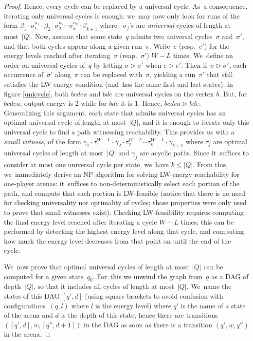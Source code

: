 \begin{proof}
Hence, every cycle can be replaced by a universal cycle. As~a consequence, iterating only universal cycles is enough: we~may now only look for runs of the form $\beta_1\cdot \sigma_1^{n_1}\cdot \beta_2\cdot\sigma_2^{n_2}\cdots
\sigma_k^{n_k}\cdot\beta_{k+1}$ where ~$\sigma_j$'s are \emph{universal} cycles
of length at most~$|Q|$. Now, assume that some state~$q$ admits
two universal cycles~$\sigma$ and~$\sigma'$, and that both cycles
appear along a given run~$\pi$. Write~$e$ (resp.~$e'$) for the energy
levels reached after iterating~$\sigma$ (reap.~$\sigma'$) $W-L$
times. We~define an order on universal cycles of~$q$ by letting
$\sigma \triangleright \sigma'$ when $e>e'$.  Then if~$\sigma \triangleright
\sigma'$, each occurrence of~$\sigma'$ along~$\pi$ can be replaced
with~$\sigma$, yielding a run~$\pi'$ that still satisfies the LW-energy condition (and~has the same first and last states). in figure \ref{unicycle}, both $bcdea$ and $bde$ are universal cycles on the vertex $b$. But, for $bcdea$, output energy is 2 while for $bde$ it is 1. Hence, $bcdea \triangleright bde$.\\
%
Generalizing this argument, each state that admits universal cycles has an optimal universal cycle
of length at most~$|Q|$, and it is enough to iterate only this
universal cycle to find a path witnessing reachability. This provides us with a \emph{small witness}, of the form $\gamma_1\cdot
\tau_1^{W-L}\cdot \gamma_2\cdot\tau_2^{W-L}\cdots
\tau_k^{W-L}\cdot\gamma_{k+1}$ where $\tau_j$ are optimal universal
cycles of length at most~$|Q|$ and $\gamma_j$ are acyclic
paths. Since it~suffices to consider at most one universal cycle per state, we~have $k\leq |Q|$.
%
From this, we~immediately derive an NP algorithm for solving
LW-energy reachability for one-player arenas: it~suffices to
non-deterministically select each portion of the path, and compute
that each portion is LW-feasible (notice that there is no need for
checking universality nor optimality of cycles; those properties were only used to prove that small witnesses exist). Checking
LW-feasibility requires computing the final energy level reached after iterating a cycle $W-L$ times; this can be performed by detecting the highest energy level along that cycle, and computing how much the energy level decreases from that point on until the end of the
cycle.

  \vskip 0.1cm
  We~now prove that optimal universal cycles of length at most~$|Q|$ can be computed for a given state~$q_0$. For~this we unwind the graph from~$q$ as a DAG of depth~$|Q|$, so that it includes all cycles of length at most~$|Q|$. We~name the states of this DAG $[q',d]$ (using square brackets to avoid confusion with configurations~$(q,l)$ where $l$ is the energy level) where $q'$ is the name of a state of the arena and $d$ is the depth of this state; hence there are transitions $([q',d],w,[q'',d+1])$ in the DAG as soon as there is a transition $(q',w,q'')$ in the arena.
  

\end{proof}
